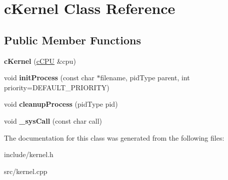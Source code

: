 \hypertarget{classcKernel}{\section{c\-Kernel \-Class \-Reference}
\label{db/da5/classcKernel}
}
\subsection*{\-Public \-Member \-Functions}
\begin{DoxyCompactItemize}
\item 
\hypertarget{classcKernel_ab430160f59d38068d280588b20643453}{{\bfseries c\-Kernel} (\hyperlink{classcCPU}{c\-C\-P\-U} \&cpu)}\label{db/da5/classcKernel_ab430160f59d38068d280588b20643453}

\item 
\hypertarget{classcKernel_a5440eace2647ffd5279de55600947b84}{void {\bfseries init\-Process} (const char $\ast$filename, pid\-Type parent, int priority=\-D\-E\-F\-A\-U\-L\-T\-\_\-\-P\-R\-I\-O\-R\-I\-T\-Y)}\label{db/da5/classcKernel_a5440eace2647ffd5279de55600947b84}

\item 
\hypertarget{classcKernel_a1e7cb5c6d9e6140e197f9b18dc8bd1b1}{void {\bfseries cleanup\-Process} (pid\-Type pid)}\label{db/da5/classcKernel_a1e7cb5c6d9e6140e197f9b18dc8bd1b1}

\item 
\hypertarget{classcKernel_acdaa8be94f13fcb1f11b3bf90bc316fa}{void {\bfseries \-\_\-sys\-Call} (const char call)}\label{db/da5/classcKernel_acdaa8be94f13fcb1f11b3bf90bc316fa}

\end{DoxyCompactItemize}


\-The documentation for this class was generated from the following files\-:\begin{DoxyCompactItemize}
\item 
include/kernel.\-h\item 
src/kernel.\-cpp\end{DoxyCompactItemize}
